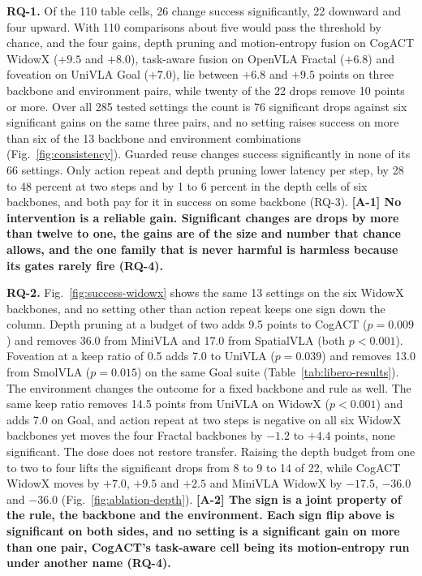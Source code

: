 \documentclass[letterpaper, 10 pt, conference]{ieeeconf}
\begin{document}
\textbf{RQ-1.} Of the 110 table cells, 26 change success significantly, 22
downward and four upward. With 110 comparisons about five would pass the
threshold by chance, and the four gains, depth pruning and motion-entropy
fusion on CogACT WidowX ($+9.5$ and $+8.0$), task-aware fusion on OpenVLA
Fractal ($+6.8$) and foveation on UniVLA Goal ($+7.0$), lie between $+6.8$
and $+9.5$ points on three backbone and environment pairs, while twenty of
the 22 drops remove 10 points or more. Over all 285 tested settings the
count is 76 significant drops against six significant gains on the same
three pairs, and no setting raises success on more than six of the 13
backbone and environment combinations (Fig.~\ref{fig:consistency}).
Guarded reuse changes success significantly in none of its 66 settings.
Only action repeat and depth pruning lower latency per step, by 28 to 48
percent at two steps and by 1 to 6 percent in the depth cells of six
backbones, and both pay for it in success on some backbone (RQ-3).
\textbf{[A-1] No intervention is a reliable gain. Significant changes are drops
by more than twelve to one, the gains are of the size and number that
chance allows, and the one family that is never harmful is harmless
because its gates rarely fire (RQ-4).}

\textbf{RQ-2.} Fig.~\ref{fig:success-widowx} shows the same 13
settings on the six WidowX backbones, and no setting other than action
repeat keeps one sign down the column. Depth pruning at a budget of two
adds 9.5 points to CogACT ($p = 0.009$) and removes 36.0 from MiniVLA and
17.0 from SpatialVLA (both $p < 0.001$).
Foveation at a keep ratio of 0.5 adds 7.0 to UniVLA ($p = 0.039$) and
removes 13.0 from SmolVLA ($p = 0.015$) on the same Goal suite
(Table~\ref{tab:libero-results}). The environment changes the outcome for
a fixed backbone and rule as well. The same keep ratio removes 14.5 points
from UniVLA on WidowX ($p < 0.001$) and adds 7.0 on Goal, and action
repeat at two steps is negative on all six WidowX backbones yet moves the
four Fractal backbones by $-1.2$ to $+4.4$ points, none significant. The
dose does not restore transfer. Raising the depth budget from one to two
to four lifts the significant drops from 8 to 9 to 14 of 22, while CogACT
WidowX moves by $+7.0$, $+9.5$ and $+2.5$ and MiniVLA WidowX by $-17.5$,
$-36.0$ and $-36.0$ (Fig.~\ref{fig:ablation-depth}). \textbf{[A-2] The sign is a
joint property of the rule, the backbone and the environment. Each sign
flip above is significant on both sides, and no setting is a significant
gain on more than one pair, CogACT's task-aware cell being its
motion-entropy run under another name (RQ-4).}
\end{document}
